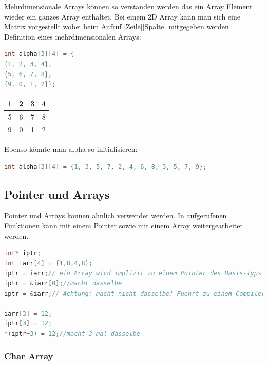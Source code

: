 Mehrdimensionale Arrays können so verstanden werden das ein Array Element wieder ein ganzes Array enthaltet.\newline
Bei einem 2D Array kann man sich eine Matrix vorgestellt wobei beim Aufruf [Zeile][Spalte] mitgegeben werden.\newline
Definition eines mehrdimensionalen Arrays:\newline
\noindent
\begin{minipage}{0.5\columnwidth}
\begin{lstlisting}[language = c]
int alpha[3][4] = {
{1, 2, 3, 4},
{5, 6, 7, 8},
{9, 0, 1, 2}};
\end{lstlisting}
\end{minipage}
\begin{minipage}{0.5\columnwidth}
\begin{tabular}{|c|c|c|c|}
\hline
1 & 2 & 3 & 4 \\ \hline
5 & 6 & 7 & 8 \\ \hline
9 & 0 & 1 & 2 \\ \hline
\end{tabular}
\end{minipage}

Ebenso könnte man alpha so initialisieren:

\begin{lstlisting}[language = c]
int alpha[3][4] = {1, 3, 5, 7, 2, 4, 6, 8, 3, 5, 7, 9};
\end{lstlisting}

\subsection{Pointer und Arrays}

Pointer und Arrays können ähnlich verwendet werden. In aufgerufenen Funktionen kann mit einem Pointer sowie mit einem Array weitergearbeitet werden. 

\begin{lstlisting}[language = c]
int* iptr;
int iarr[4] = {1,8,4,8};
iptr = iarr;// ein Array wird implizit zu einem Pointer des Basis-Typs gewandelt
iptr = &iarr[0];//macht dasselbe
iptr = &iarr;// Achtung: macht nicht dasselbe! Fuehrt zu einem Compiler-Fehler!

iarr[3] = 12;
iptr[3] = 12;
*(iptr+3) = 12;//macht 3-mal dasselbe
\end{lstlisting}

\subsubsection{Char Array}

